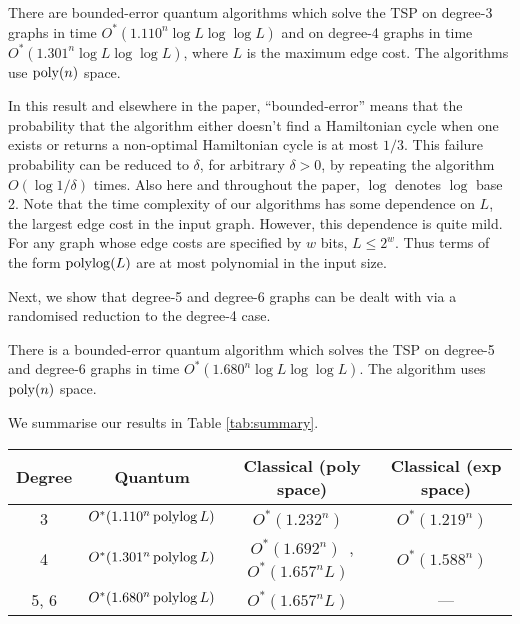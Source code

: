 \begin{theorem}
There are bounded-error quantum algorithms which solve the TSP on degree-3 graphs in time $O^*(1.110^n \log L \log \log L)$ and on degree-4 graphs in time $O^*(1.301^n \log L \log \log L)$, where $L$ is the maximum edge cost. The algorithms use $\operatorname{poly}(n)$ space.
\label{thm:deg34}
\end{theorem}

In this result and elsewhere in the paper, ``bounded-error'' means that the probability that the algorithm either doesn't find a Hamiltonian cycle when one exists or returns a non-optimal Hamiltonian cycle is at most $1/3$. This failure probability can be reduced to $\delta$, for arbitrary $\delta > 0$, by repeating the algorithm $O(\log 1/\delta)$ times. Also here and throughout the paper, $\log$ denotes $\log$ base 2. Note that the time complexity of our algorithms has some dependence on $L$, the largest edge cost in the input graph. However, this dependence is quite mild. For any graph whose edge costs are specified by $w$ bits, $L \le 2^w$. Thus terms of the form $\operatorname{polylog}(L)$ are at most polynomial in the input size.

Next, we show that degree-5 and degree-6 graphs can be dealt with via a randomised reduction to the degree-4 case.

\begin{theorem}
\label{thm:deg6}
There is a bounded-error quantum algorithm which solves the TSP on degree-5 and degree-6 graphs in time $O^*(1.680^n\log L \log \log L)$. The algorithm uses $\operatorname{poly}(n)$ space.
\end{theorem}

We summarise our results in Table \ref{tab:summary}.

\begin{table*}
\begin{center}
\begin{tabular}{|c|c|c|c|}
\hline Degree & Quantum & Classical (poly space) & Classical (exp space) \\
\hline 3 & $O^*(1.110^n \operatorname{polylog} L)$ & $O^*(1.232^n)$~\cite{xiao2016degree3} & $O^*(1.219^n)$~\cite{bodlaender15} \\
 4 & $O^*(1.301^n \operatorname{polylog} L)$ & $O^*(1.692^n)$~\cite{xiao2016degree4}, $O^*(1.657^n L)$~\cite{bjorklund14} & $O^*(1.588^n)$~\cite{cygan11}\\
 5, 6 & $O^*(1.680^n \operatorname{polylog} L)$ & $O^*(1.657^n L)$~\cite{bjorklund14} & --- \\
\hline
\end{tabular}
\end{center}
\caption[Runtimes of our quantum algorithms for the Travelling Salesman Problem]{Runtimes of our quantum algorithms for a graph of $n$ vertices with maximum edge cost $L$, compared with the best classical algorithms known.}
\label{tab:summary}
\end{table*}


